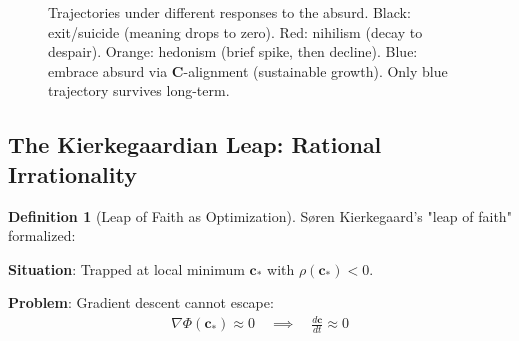 \documentclass[11pt,a4paper]{article}
\theoremstyle{definition}
\newtheorem{definition}{Definition}[section]
\theoremstyle{remark}
\newcommand{\cc}{\mathbf{c}}
\begin{document}
\begin{small}
\begin{enumerate}
\begin{figure}[H]
\centering
{}
\caption{Trajectories under different responses to the absurd. Black: exit/suicide (meaning drops to zero). Red: nihilism (decay to despair). Orange: hedonism (brief spike, then decline). Blue: embrace absurd via \(\mathbf{C}\)-alignment (sustainable growth). Only blue trajectory survives long-term.}
\label{fig:absurd_responses}
\end{figure}

\subsection{The Kierkegaardian Leap: Rational Irrationality}

\begin{definition}[Leap of Faith as Optimization]
Søren Kierkegaard's "leap of faith" formalized:

\textbf{Situation}: Trapped at local minimum \(\cc_*\) with \(\rho(\cc_*) < 0\).

\textbf{Problem}: Gradient descent cannot escape:
\begin{align}
\nabla \Phi(\cc_*) \approx 0 \quad \implies \quad \frac{d\cc}{dt} \approx 0
\end{align}


\end{definition}
\end{enumerate}
\end{small}
\end{document}
